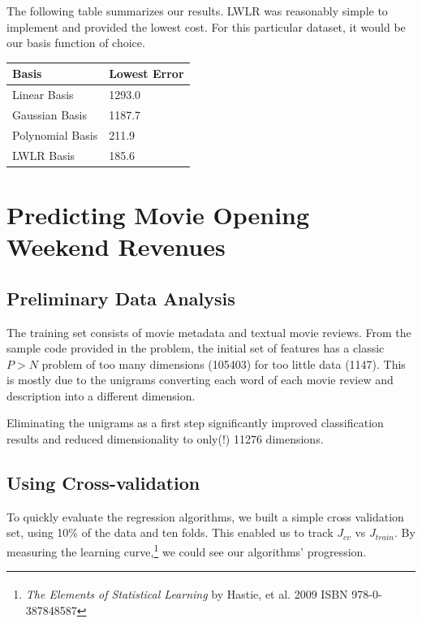 \documentclass[11pt, oneside]{article}   	%
\begin{document}
The following table summarizes our results. LWLR was reasonably simple to implement and provided the lowest cost. For this particular dataset, it would be our basis function of choice.

\begin{center}
    \begin{tabular}{| l | l |}
    \hline
    Basis & Lowest Error \\ \hline
    Linear Basis & \hfill 1293.0 \\
    Gaussian Basis & \hfill 1187.7 \\
    Polynomial Basis & \hfill 211.9 \\
    LWLR Basis & \hfill 185.6 \\
    \hline
    \end{tabular}
\end{center}
\clearpage

\section*{Predicting Movie Opening Weekend Revenues}


\subsection*{Preliminary Data Analysis}

The training set consists of movie metadata and textual movie reviews. From the sample code provided in the problem, the initial set of features has a classic $P > N$ problem of too many dimensions (105403) for too little data (1147).  This is mostly due to the unigrams converting each word of each movie review and description into a different dimension.

Eliminating the unigrams as a first step significantly improved classification results and reduced dimensionality to only(!) 11276 dimensions. 
\subsection*{Using Cross-validation}

To quickly evaluate the regression algorithms, we built a simple cross validation set, using 10\% of the data and ten folds. This enabled us to track $J_{cv}$ vs $J_{train}$. By measuring the learning curve,\footnote{\emph{The Elements of Statistical Learning} by Hastie, et al. \textsuperscript{\textcopyright} 2009 ISBN 978-0-387848587} we could see our algorithms' progression.
\end{document}
